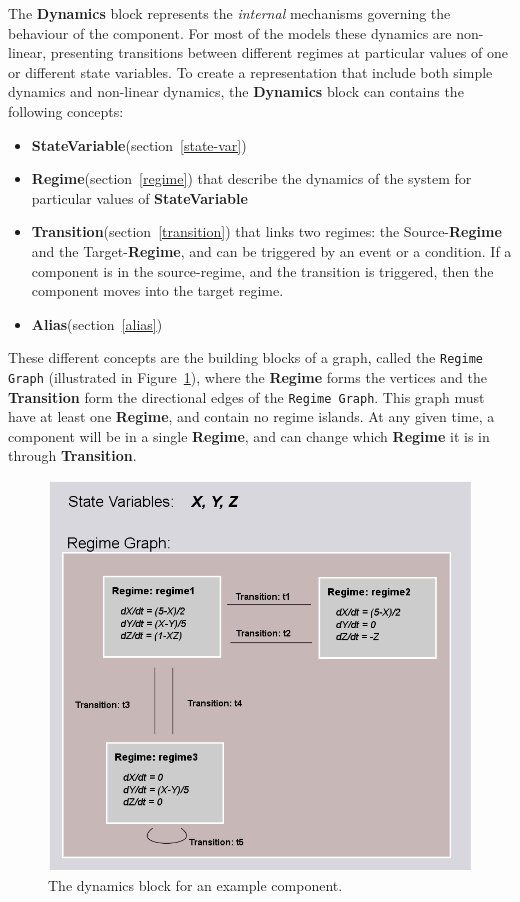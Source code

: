 \documentclass{article}
\newcommand{\Dynamics}{{\bf{Dynamics}}\xspace}
\newcommand{\StateVariable}{{\bf{StateVariable}}\xspace}
\newcommand{\Alias}{{\bf{Alias}}\xspace}
\newcommand{\Regime}{{\bf{Regime}}\xspace}
\newcommand{\Transition}{{\bf{Transition}}\xspace}
\begin{document}
The \Dynamics block represents the \emph{internal} mechanisms
governing the behaviour of the component.  For most of the models
these dynamics are non-linear, presenting transitions between
different regimes at particular values of one or different state
variables.  To create a representation that include both simple
dynamics and non-linear dynamics, the \Dynamics block can contains the
following concepts:

\begin{itemize}
\item \StateVariable (section~\ref{state-var})
\item \Regime (section~\ref{regime}) that describe the dynamics of the
system for particular values of \StateVariable
\item \Transition (section~\ref{transition}) that links two
regimes: the Source-\Regime and the Target-\Regime, and can be triggered by
an event or a condition. If a component is in the source-regime, and the
transition is triggered, then the component moves into the target regime.
\item \Alias (section~\ref{alias})
\end{itemize}


These different concepts are the building blocks of a graph, called
the {\tt Regime Graph} (illustrated in Figure~\ref{SimpleRegimeGraph}),
where the \Regime forms the vertices and the \Transition form the
directional edges of the {\tt Regime Graph}. This graph must have at
least one \Regime, and contain no regime islands. At any given time,
a component will be in a single \Regime, and can change which \Regime
it is in through \Transition.

\begin{figure}[htb!]
\center
\includegraphics[width=14cm]{images/SimpleRegimeGraph.png}
\protect\caption{The dynamics block for an example component.}
\label{SimpleRegimeGraph}
\end{figure}
\end{document}
